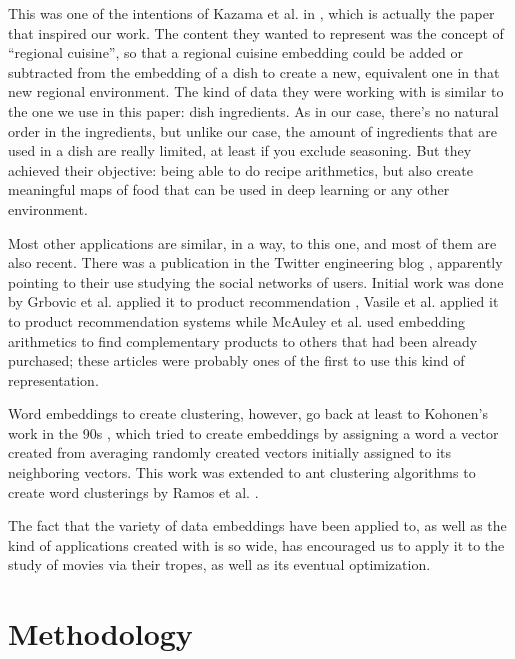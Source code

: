 \documentclass[letterpaper]{article}
\begin{document}
	This was one of the intentions of Kazama et al. in
	\cite{kazama2018}, which is actually the paper that inspired
	our work. The content they wanted to represent was the concept
	of ``regional cuisine'', so that a regional cuisine embedding
	could be added or subtracted from the embedding of a dish to
	create a new, equivalent one in that new regional
	environment. The kind of data they were working with is
	similar to the one we use in this paper: dish ingredients. As
	in our case, there's no natural order in the ingredients, but
	unlike our case, the amount of ingredients that are used in a
	dish are really limited, at least if you exclude
	seasoning. But they achieved their objective: being able to do
	recipe arithmetics, but also create meaningful maps of food
	that can be used in deep learning or any other environment.
	
	Most other applications are similar, in a way, to this one,
	and most of them are also recent. There was a publication in
	the Twitter engineering blog \cite{twitter:embeddings},
	apparently pointing to their use studying the social networks
	of users. Initial work was done by Grbovic et al. applied it to product recommendation
	\cite{Grbovic2015}, Vasile et al. applied it to product
	recommendation systems \cite{vasile2016} while McAuley et
	al. \cite{DBLP:journals/corr/McAuleyPL15} used embedding
	arithmetics to find complementary products to others that had
	been already purchased; these articles were
	probably ones of the first to use this kind of
	representation.
	
	Word embeddings to create clustering, however, go back at
	least to Kohonen's work in the 90s
	\cite{kohonen1997exploration}, which tried to create
	embeddings by assigning a word a vector created from averaging
	randomly created vectors initially assigned to its neighboring
	vectors. This work was extended to ant clustering algorithms
	to create word clusterings by Ramos et
	al. \cite{DBLP:journals/corr/abs-cs-0412075}.
	
	The fact that the variety of data embeddings have been applied
	to, as well as the kind of applications created with is so
	wide, has encouraged us to apply it to the study of movies via
	their tropes, as well as its eventual optimization.
	
	\section{Methodology}
	\label{sec:met}
	
\end{document}
